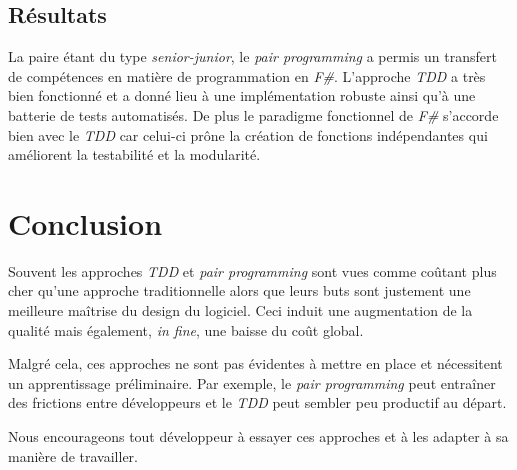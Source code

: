 \documentclass[journal, a4paper, frenchb]{IEEEtran}
\begin{document}
\subsection{Résultats}

La paire étant du type \emph{senior-junior}, le \emph{pair programming} a permis un transfert de compétences en matière de programmation en \emph{F\#}. L'approche \emph{TDD} a très bien fonctionné et a donné lieu à une implémentation robuste ainsi qu'à une batterie de tests automatisés. De plus le paradigme fonctionnel de \emph{F\#} s'accorde bien avec le \emph{TDD} car celui-ci prône la création de fonctions indépendantes qui améliorent la testabilité et la modularité.


\section{Conclusion}

Souvent les approches \emph{TDD} et \emph{pair programming} sont vues comme coûtant plus cher qu'une approche traditionnelle alors que leurs buts sont justement une meilleure maîtrise du design du logiciel. Ceci induit une augmentation de la qualité mais également, \emph{in fine}, une baisse du coût global.

Malgré cela, ces approches ne sont pas évidentes à mettre en place et nécessitent un apprentissage préliminaire. Par exemple, le \emph{pair programming} peut entraîner des frictions entre développeurs et le \emph{TDD} peut sembler peu productif au départ.

Nous encourageons tout développeur à essayer ces approches et à les adapter à sa manière de travailler.
\end{document}
